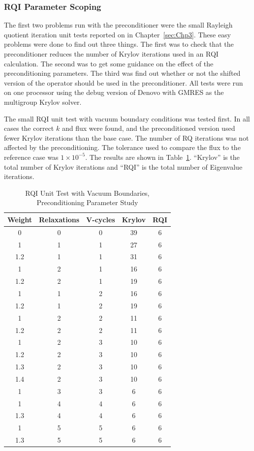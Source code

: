 \subsubsection{RQI Parameter Scoping}
The first two problems run with the preconditioner were the small Rayleigh quotient iteration unit tests reported on in Chapter~\ref{sec:Chp3}. These easy problems were done to find out three things. The first was to check that the preconditioner reduces the number of Krylov iterations used in an RQI calculation. The second was to get some guidance on the effect of the preconditioning parameters. The third was find out whether or not the shifted version of the operator should be used in the preconditioner. All tests were run on one processor using the debug version of Denovo with GMRES as the multigroup Krylov solver.

The small RQI unit test with vacuum boundary conditions was tested first. In all cases the correct $k$ and flux were found, and the preconditioned version used fewer Krylov iterations than the base case. The number of RQ iterations was not affected by the preconditioning. The tolerance used to compare the flux to the reference case was $1 \times 10^{-5}$. The results are shown in Table~\ref{table:RQIUnitTestVac}. ``Krylov'' is the total number of Krylov iterations and ``RQI'' is the total number of Eigenvalue iterations.
%
\begin{table}[!h]
\caption{RQI Unit Test with Vacuum Boundaries, Preconditioning Parameter Study}
\begin{center}
\begin{tabular}{c c c c c}
\hline
Weight & Relaxations & V-cycles & Krylov & RQI \\[0.5ex]
\hline
0    & 0 & 0 & 39 & 6 \\
1    & 1 & 1 & 27 & 6 \\
1.2 & 1 & 1 & 31 & 6 \\
1    & 2 & 1 & 16 & 6 \\
1.2 & 2 & 1 & 19 & 6 \\
1    & 1 & 2 & 16 & 6 \\
1.2 & 1 & 2 & 19 & 6 \\
1    & 2 & 2 & 11 & 6 \\
1.2 & 2 & 2 & 11 & 6 \\
\hline
1    & 2 & 3 & 10 & 6 \\
1.2 & 2 & 3 & 10 & 6 \\
1.3 & 2 & 3 & 10 & 6 \\
1.4 & 2 & 3 & 10 & 6 \\
\hline
1    & 3 & 3 & 6   & 6 \\
1    & 4 & 4 & 6   & 6 \\
1.3 & 4 & 4 & 6   & 6 \\
1    & 5 & 5 & 6   & 6 \\
1.3 & 5 & 5 & 6   & 6 \\
\hline 
\end{tabular}
\end{center}
\label{table:RQIUnitTestVac}
\end{table}

